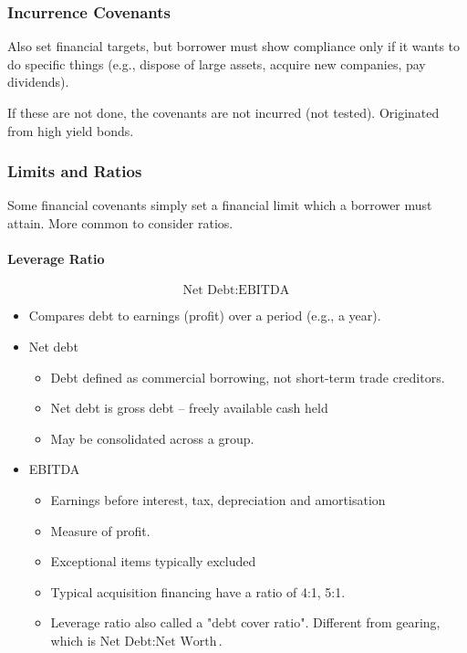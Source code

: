 \documentclass[
]{article}
\providecommand{\tightlist}{%
  \setlength{\itemsep}{0pt}\setlength{\parskip}{0pt}}
\begin{document}
\hypertarget{incurrence-covenants}{%
\subsubsection{Incurrence Covenants}\label{incurrence-covenants}}

Also set financial targets, but borrower must show compliance only if it
wants to do specific things (e.g., dispose of large assets, acquire new
companies, pay dividends).

If these are not done, the covenants are not incurred (not tested).
Originated from high yield bonds.

\hypertarget{limits-and-ratios}{%
\subsubsection{Limits and Ratios}\label{limits-and-ratios}}

Some financial covenants simply set a financial limit which a borrower
must attain. More common to consider ratios.

\hypertarget{leverage-ratio}{%
\paragraph{Leverage Ratio}\label{leverage-ratio}}

\[\text{Net\ Debt}:\text{EBITDA}\]

\begin{itemize}
\tightlist
\item
  Compares debt to earnings (profit) over a period (e.g., a year).
\item
  Net debt

  \begin{itemize}
  \tightlist
  \item
    Debt defined as commercial borrowing, not short-term trade
    creditors.
  \item
    Net debt is gross debt -- freely available cash held
  \item
    May be consolidated across a group.
  \end{itemize}
\item
  EBITDA

  \begin{itemize}
  \tightlist
  \item
    Earnings before interest, tax, depreciation and amortisation
  \item
    Measure of profit.
  \item
    Exceptional items typically excluded
  \item
    Typical acquisition financing have a ratio of 4:1, 5:1.
  \item
    Leverage ratio also called a "debt cover ratio". Different from
    gearing, which is {\(\text{Net\ Debt}:\text{Net\ Worth}\)}.
  \end{itemize}
\end{itemize}
\end{document}

